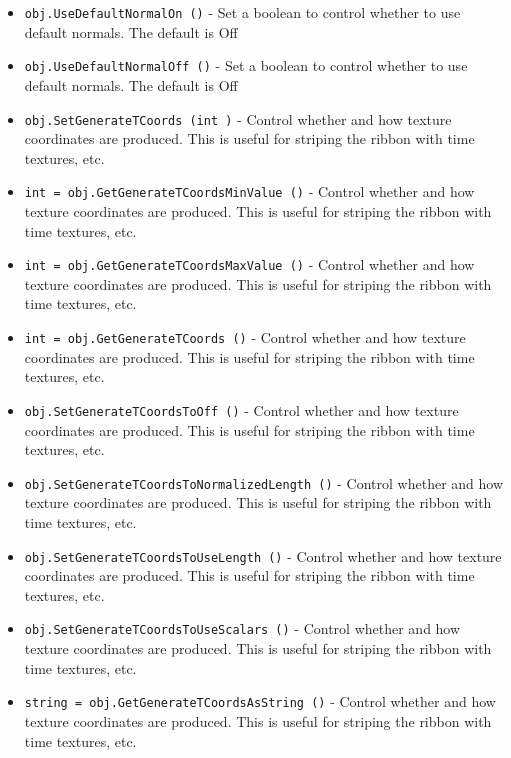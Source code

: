 \begin{itemize}
\item  \verb|obj.UseDefaultNormalOn ()| -  Set a boolean to control whether to use default normals.
 The default is Off

\item  \verb|obj.UseDefaultNormalOff ()| -  Set a boolean to control whether to use default normals.
 The default is Off

\item  \verb|obj.SetGenerateTCoords (int )| -  Control whether and how texture coordinates are produced. This is
 useful for striping the ribbon with time textures, etc.

\item  \verb|int = obj.GetGenerateTCoordsMinValue ()| -  Control whether and how texture coordinates are produced. This is
 useful for striping the ribbon with time textures, etc.

\item  \verb|int = obj.GetGenerateTCoordsMaxValue ()| -  Control whether and how texture coordinates are produced. This is
 useful for striping the ribbon with time textures, etc.

\item  \verb|int = obj.GetGenerateTCoords ()| -  Control whether and how texture coordinates are produced. This is
 useful for striping the ribbon with time textures, etc.

\item  \verb|obj.SetGenerateTCoordsToOff ()| -  Control whether and how texture coordinates are produced. This is
 useful for striping the ribbon with time textures, etc.

\item  \verb|obj.SetGenerateTCoordsToNormalizedLength ()| -  Control whether and how texture coordinates are produced. This is
 useful for striping the ribbon with time textures, etc.

\item  \verb|obj.SetGenerateTCoordsToUseLength ()| -  Control whether and how texture coordinates are produced. This is
 useful for striping the ribbon with time textures, etc.

\item  \verb|obj.SetGenerateTCoordsToUseScalars ()| -  Control whether and how texture coordinates are produced. This is
 useful for striping the ribbon with time textures, etc.

\item  \verb|string = obj.GetGenerateTCoordsAsString ()| -  Control whether and how texture coordinates are produced. This is
 useful for striping the ribbon with time textures, etc.


\end{itemize}
